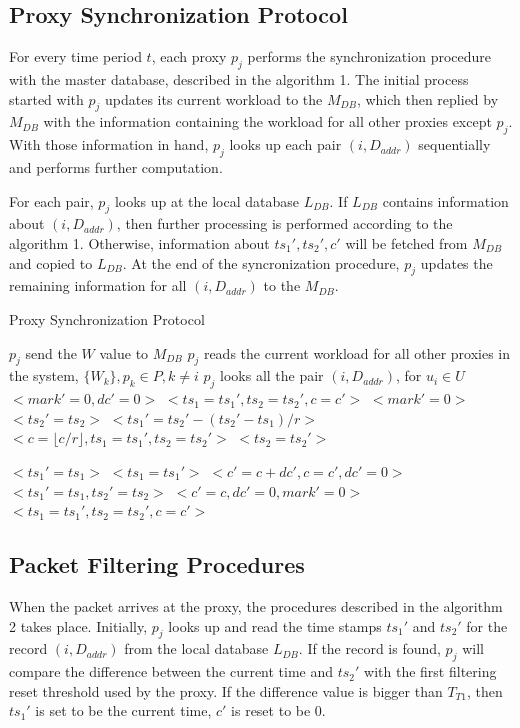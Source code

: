 \documentclass[sigplan,screen]{acmart}
\begin{document}
\subsection{Proxy Synchronization Protocol}
\label{psp}
For every time period $t$, each proxy $p_j$ performs the synchronization procedure with the master database, described in the algorithm 1. The initial process started with $p_j$ updates its current workload to the $M_{DB}$, which then replied by $M_{DB}$ with the information containing the workload for all other proxies except $p_j$. With those information in hand, $p_j$ looks up each pair $(i, D_{addr})$ sequentially and performs further computation.

For each pair, $p_j$ looks up at the local database $L_{DB}$. If $L_{DB}$ contains information about $(i, D_{addr})$, then further processing is performed according to the algorithm 1. Otherwise, information about $ts_1', ts_2', c'$ will be fetched from $M_{DB}$ and copied to $L_{DB}$. At the end of the syncronization procedure, $p_j$ updates the remaining information for all $(i, D_{addr})$ to the $M_{DB}$.

\begin{algorithm}
\caption{Proxy Synchronization Protocol}
\begin{algorithmic}[1]
\label{alg_psp}
\State $p_j$ send the $W$ value to $M_{DB}$
\State $p_j$ reads the current workload for all other proxies in the system, $\{W_k\}, p_k \in P, k \neq i$
\State $p_j$ looks all the pair $(i, D_{addr})$, for $u_i \in U$
			\State $<mark' = 0, dc' = 0>$
			\State $<ts_1=ts_1', ts_2=ts_2', c=c'>$
		\Else
			\State $<mark' = 0>$
				\State $<ts_2'=ts_2>$
				\State $<ts_1'=ts_2'-(ts_2'-ts_1)/r>$
				\State $<c = \lfloor c/r \rfloor, ts_1=ts_1', ts_2=ts_2'>$
			\Else
				\State $<ts_2=ts_2'>$
			\EndIf
			
				\State $<ts_1'=ts_1>$
				\State $<ts_1=ts_1'>$
			\EndIf
			\State $<c'=c+dc', c=c', dc'=0>$
		\EndIf
	\Else
		\State $<ts_1'=ts_1, ts_2'=ts_2>$
		\State $<c'=c, dc'= 0, mark'=0>$
	\EndIf
\EndFor
{}
		\State $<ts_1=ts_1', ts_2=ts_2', c=c'>$
	\EndIf
\EndFor
\end{algorithmic}
\end{algorithm}

\subsection{Packet Filtering Procedures}
When the packet arrives at the proxy, the procedures described in the algorithm 2 takes place. Initially, $p_j$ looks up and read the time stamps $ts_1'$ and $ts_2'$ for the record $(i, D_{addr})$ from the local database $L_{DB}$. If the record is found, $p_j$ will compare the difference between the current time and $ts_2'$ with the first filtering reset threshold used by the proxy. If the difference value is bigger than $T_{T1}$, then $ts_1'$ is set to be the current time, $c'$ is reset to be 0.
\end{document}
